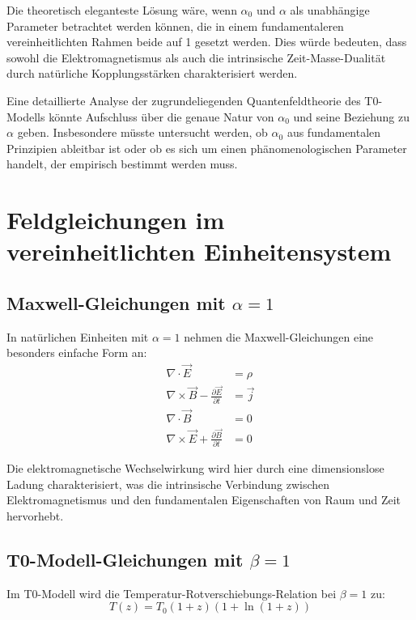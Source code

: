 \documentclass[12pt,a4paper]{article}
\begin{document}
	Die theoretisch eleganteste Lösung wäre, wenn $\alpha_0$ und $\alpha$ als unabhängige Parameter betrachtet werden können, die in einem fundamentaleren vereinheitlichten Rahmen beide auf 1 gesetzt werden. Dies würde bedeuten, dass sowohl die Elektromagnetismus als auch die intrinsische Zeit-Masse-Dualität durch natürliche Kopplungsstärken charakterisiert werden.
	
	Eine detaillierte Analyse der zugrundeliegenden Quantenfeldtheorie des T0-Modells könnte Aufschluss über die genaue Natur von $\alpha_0$ und seine Beziehung zu $\alpha$ geben. Insbesondere müsste untersucht werden, ob $\alpha_0$ aus fundamentalen Prinzipien ableitbar ist oder ob es sich um einen phänomenologischen Parameter handelt, der empirisch bestimmt werden muss.
	
	\section{Feldgleichungen im vereinheitlichten Einheitensystem}
	
	\subsection{Maxwell-Gleichungen mit $\alpha = 1$}
	
	In natürlichen Einheiten mit $\alpha = 1$ nehmen die Maxwell-Gleichungen eine besonders einfache Form an:
	\begin{align}
		\nabla \cdot \vec{E} &= \rho \\
		\nabla \times \vec{B} - \frac{\partial \vec{E}}{\partial t} &= \vec{j} \\
		\nabla \cdot \vec{B} &= 0 \\
		\nabla \times \vec{E} + \frac{\partial \vec{B}}{\partial t} &= 0
	\end{align}
	
	Die elektromagnetische Wechselwirkung wird hier durch eine dimensionslose Ladung charakterisiert, was die intrinsische Verbindung zwischen Elektromagnetismus und den fundamentalen Eigenschaften von Raum und Zeit hervorhebt.
	
	\subsection{T0-Modell-Gleichungen mit $\beta = 1$}
	
	Im T0-Modell wird die Temperatur-Rotverschiebungs-Relation bei $\beta = 1$ zu:
	\begin{equation}
		T(z) = T_0 (1+z)(1+\ln(1+z))
	\end{equation}
	
\end{document}
